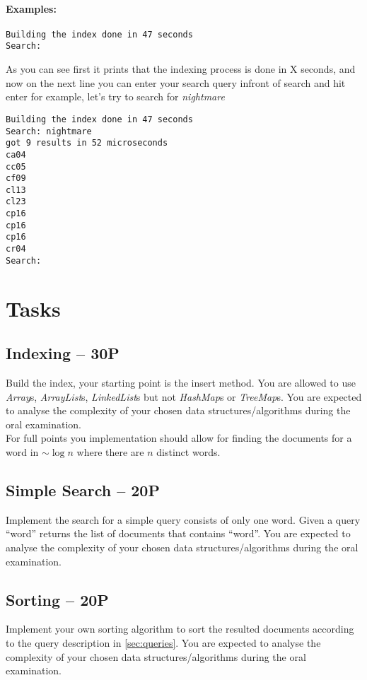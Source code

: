 \documentclass[11pt]{article}
\begin{document}
\paragraph{\textbf{Examples:}}
\begin{verbatim}
Building the index done in 47 seconds
Search: 
\end{verbatim}

As you can see first it prints that the indexing process is done in X seconds, and now on the next line you can enter your search query infront of search and hit enter for example, let's try to search for \textit{nightmare}

\begin{verbatim}
Building the index done in 47 seconds
Search: nightmare
got 9 results in 52 microseconds
ca04
cc05
cf09
cl13
cl23
cp16
cp16
cp16
cr04
Search: 
\end{verbatim}
 
 
\section{Tasks}

\subsection{Indexing -- 30P} 
\label{ssec:indexing}
Build the index, your starting point is the insert method. You are allowed to use \emph{Array}s, \emph{ArrayList}s, \emph{LinkedList}s but not \emph{HashMap}s or \emph{TreeMap}s. You are expected to analyse the complexity of your chosen data structures/algorithms during the oral examination.\\

For full points you implementation should allow for finding the documents for a word in $\sim \log n$ where there are $n$ distinct words.

\subsection{Simple Search -- 20P} 
Implement the search for a simple query consists of only one word. Given a query ``word'' returns the list of documents that contains ``word''. You are expected to analyse the complexity of your chosen data structures/algorithms during the oral examination.

\subsection{Sorting -- 20P} 
Implement your own sorting algorithm to sort the resulted documents according to the query description in \ref{sec:queries}. You are expected to analyse the complexity of your chosen data structures/algorithms during the oral examination.
\end{document}
